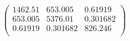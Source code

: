 \documentclass{article}
\begin{document}
\[\left(
\begin{array}{ccc}
 1462.51 & 653.005 & 0.61919 \\
 653.005 & 5376.01 & 0.301682 \\
 0.61919 & 0.301682 & 826.246 \\
\end{array}
\right)\]
\end{document}
